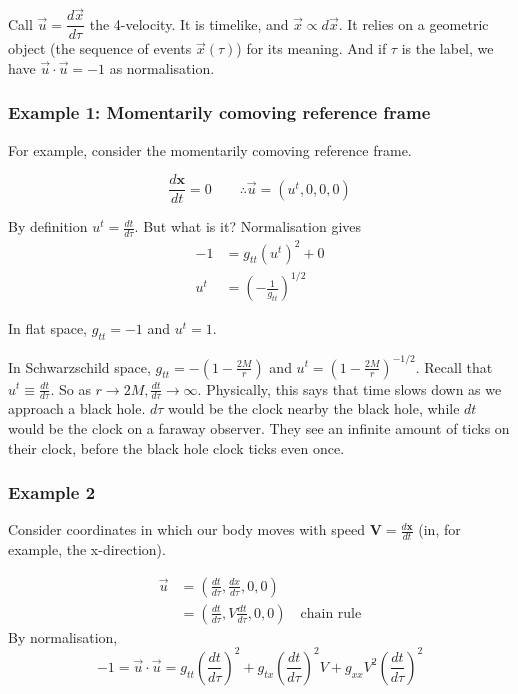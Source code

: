 \documentclass[a4paper]{article} %
\newcommand{\vect}[1]{\mathbf{#1}} %
\begin{document}
Call $\vec{u}=\dfrac{d\vec{x}}{d\tau}$ the 4-velocity. It is timelike, and $\vec{x}\propto d\vec{x}$. It relies on a geometric object (the sequence of events $\vec{x}(\tau)$) for its meaning. And if $\tau$ is the label, we have $\vec{u}\cdot \vec{u}=-1$ as normalisation.

\subsubsection{Example 1: Momentarily comoving reference frame}
For example, consider the momentarily comoving reference frame.

\begin{equation}
\frac{d\mathbf{x}}{dt}=0 \qquad \therefore \vec{u}=(u^t,0,0,0)
\end{equation}

By definition $u^t=\frac{dt}{d\tau}$. But what is it? Normalisation gives
\begin{align*}
-1&=g_{tt}(u^t)^2+0\\
u^t&=\left(-\frac{1}{g_{tt}}\right)^{1/2}
\end{align*}

In flat space, $g_{tt}=-1$ and $u^t=1$.

In Schwarzschild space, $g_{tt}=-\left(1-\frac{2M}{r}\right)$ and $u^t=\left(1-\frac{2M}{r}\right)^{-1/2}$. Recall that $u^t \equiv \frac{dt}{d\tau}$. So as $r\to 2M, \frac{dt}{d\tau}\to \infty$. Physically, this says that time slows down as we approach a black hole. $d\tau$ would be the clock nearby the black hole, while $dt$ would be the clock on a faraway observer. They see an infinite amount of ticks on their clock, before the black hole clock ticks even once.

\subsubsection{Example 2}
Consider coordinates in which our body moves with speed $\vect{V}=\frac{d\vect{x}}{dt}$ (in, for example, the x-direction).

\begin{align*}
\vec{u}&=\left(\frac{dt}{d\tau},\frac{dx}{d\tau},0,0 \right)\\
&=\left(\frac{dt}{d\tau}, V\frac{dt}{d\tau},0,0\right) \quad \text{chain rule}
\end{align*}
By normalisation,
\begin{equation}
-1=\vec{u}\cdot\vec{u}=g_{tt}\left(\frac{dt}{d\tau}\right)^2+g_{tx}\left(\frac{dt}{d\tau}\right)^2 V+g_{xx}V^2\left(\frac{dt}{d\tau}\right)^2
\end{equation}
\end{document}
